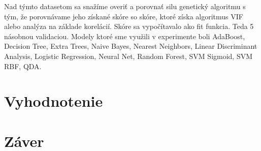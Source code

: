 \documentclass[runningheads]{llncs}
\begin{document}
Nad týmto datasetom sa snažíme overiť a porovnať silu genetický algoritmu s tým, že porovnávame 
jeho získané skóre so skóre, ktoré získa algoritmus VIF alebo analýza na základe korelácií. Skóre sa 
vypočítavalo ako fit funkcia. Teda 5 násobnou validaciou. Modely ktoré sme využili v experimente boli 
AdaBoost, Decision Tree, Extra Trees, Naive Bayes, Nearest Neighbors, Linear Discriminant Analysis, 
Logistic Regression, Neural Net, Random Forest, SVM Sigmoid, SVM RBF, QDA.

\section{Vyhodnotenie}

\section{Záver}
\end{document}
